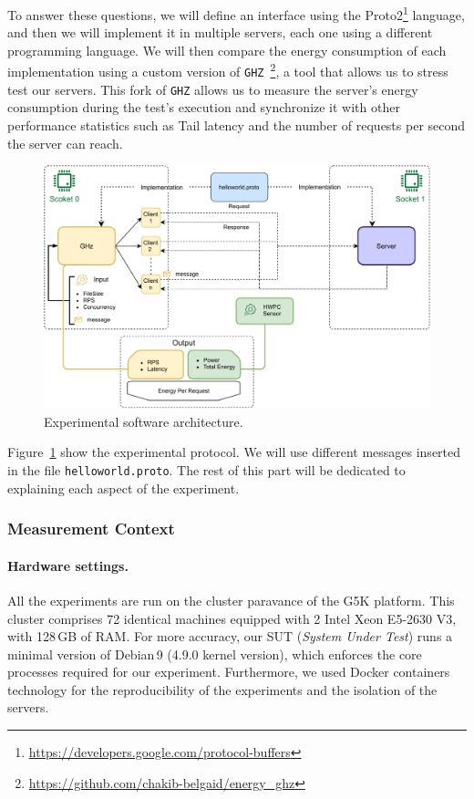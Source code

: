 To answer these questions, we will define an interface using the Proto2\footnote{\url{https://developers.google.com/protocol-buffers}} language, and then we will implement it in multiple servers, each one using a different programming language.
We will then compare the energy consumption of each implementation using a custom version of \texttt{GHZ}~\footnote{\url{https://github.com/chakib-belgaid/energy_ghz}}, a tool that allows us to stress test our servers. This fork of \texttt{GHZ} allows us to measure the server's energy consumption during the test's execution and synchronize it with other performance statistics such as Tail latency and the number of requests per second the server can reach.
\begin{figure}[!hbt]
    \begin{center}
        \includegraphics[width=.8\linewidth]{imgs/rpcprotocol}
    \end{center}
    \caption{Experimental software architecture.}\label{fig:rpcprotocol}
\end{figure}
Figure~\ref{fig:rpcprotocol} show the experimental protocol. We will use different messages inserted in the file \texttt{helloworld.proto}.
The rest of this part will be dedicated to explaining each aspect of the experiment.
\subsubsection{Measurement Context}
\paragraph{Hardware settings.}
All the experiments are run on the cluster \textsf{paravance} of the G5K platform.
This cluster comprises 72 identical machines equipped with 2 Intel Xeon E5-2630 V3, with 128\,GB of RAM.
For more accuracy, our SUT (\emph{System Under Test}) runs a minimal version of Debian\,9 (4.9.0 kernel version), which enforces the core processes required for our experiment.
Furthermore, we used Docker containers technology for the reproducibility of the experiments and the isolation of the servers.
